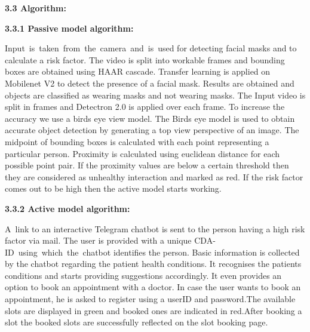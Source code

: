 \documentclass[12pt]{article}
\begin{document}
\begin{FlushLeft}
{\fontsize{14pt}{16.8pt}\selectfont \textbf{3.3 Algorithm:}}
\end{FlushLeft}
\begin{FlushLeft}
{\fontsize{13pt}{15.6pt}\selectfont \textbf{3.3.1 Passive model algorithm:}}
\end{FlushLeft}
\begin{justify}
Input\ is\ taken\ from\ the\ camera\ and\ is\ used for detecting facial masks and to calculate a risk factor. The video is split into workable frames and bounding boxes are obtained  using HAAR cascade. Transfer learning is  applied on Mobilenet V2 to detect the presence of  a facial mask. Results are obtained and objects are classified as wearing masks and not wearing masks. The Input video is split in frames and Detectron 2.0 is applied over each frame. To increase the accuracy we use a birds eye view  model. The Birds eye model is used to  obtain accurate object detection by generating a top view perspective of an image. The midpoint of bounding boxes is calculated with  each point representing  a particular person. Proximity is calculated using euclidean distance for each possible point pair. If the proximity values are below a certain threshold then they are considered as unhealthy interaction and marked as red. If the risk factor comes out to be high  then the active model starts working.
\end{justify}

\vspace{\baselineskip}
\begin{FlushLeft}
{\fontsize{14pt}{16.8pt}\selectfont \textbf{3.3.2 Active model algorithm:}}
\end{FlushLeft}
\begin{justify}
A\ link to an interactive Telegram chatbot is sent to the person having a high risk factor via mail. The user is provided with  a unique CDA-ID\ using\ which\ the\ chatbot identifies the person. Basic information is collected by the chatbot regarding the patient health conditions. It recognises the patients  conditions and starts  providing  suggestions accordingly. It even provides an option to book an appointment with  a doctor. In case the user wants to book an appointment, he is asked to register using a userID and password.The available slots are displayed in green and booked ones are indicated in red.After booking a slot the booked slots are successfully reflected on the slot booking page.
\end{justify}
\end{document}
